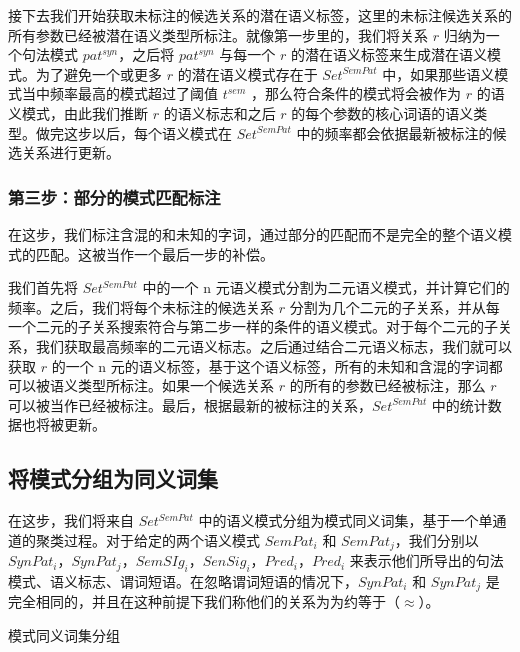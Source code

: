 接下去我们开始获取未标注的候选关系的潜在语义标签，这里的未标注候选关系的所有参数已经被潜在语义类型所标注。就像第一步里的，我们将关系 $r$ 归纳为一个句法模式 $pat^{syn}$，之后将 $pat^{syn}$ 与每一个 $r$ 的潜在语义标签来生成潜在语义模式。为了避免一个或更多 $r$ 的潜在语义模式存在于 $Set^{SemPat}$ 中，如果那些语义模式当中频率最高的模式超过了阈值 $t^{sem}$ ，那么符合条件的模式将会被作为 $r$ 的语义模式，由此我们推断 $r$ 的语义标志和之后 $r$ 的每个参数的核心词语的语义类型。做完这步以后，每个语义模式在 $Set^{SemPat}$ 中的频率都会依据最新被标注的候选关系进行更新。

\subsubsection{第三步：部分的模式匹配标注}
在这步，我们标注含混的和未知的字词，通过部分的匹配而不是完全的整个语义模式的匹配。这被当作一个最后一步的补偿。

我们首先将 $Set^{SemPat}$ 中的一个 n 元语义模式分割为二元语义模式，并计算它们的频率。之后，我们将每个未标注的候选关系 $r$ 分割为几个二元的子关系，并从每一个二元的子关系搜索符合与第二步一样的条件的语义模式。对于每个二元的子关系，我们获取最高频率的二元语义标志。之后通过结合二元语义标志，我们就可以获取 $r$ 的一个 n 元的语义标签，基于这个语义标签，所有的未知和含混的字词都可以被语义类型所标注。如果一个候选关系 $r$ 的所有的参数已经被标注，那么 $r$ 可以被当作已经被标注。最后，根据最新的被标注的关系，$Set^{SemPat}$ 中的统计数据也将被更新。

\subsection{将模式分组为同义词集}
在这步，我们将来自 $Set^{SemPat}$ 中的语义模式分组为模式同义词集，基于一个单通道的聚类过程\citep{papka1998}。对于给定的两个语义模式 $SemPat_i$ 和 $SemPat_j$，我们分别以 $SynPat_i$，$SynPat_j$，$SemSIg_i$，$SenSig_i$，$Pred_i$，$Pred_i$ 来表示他们所导出的句法模式、语义标志、谓词短语。在忽略谓词短语的情况下，$SynPat_i$  和 $SynPat_j$ 是完全相同的，并且在这种前提下我们称他们的关系为为约等于（$ \approx$）。

\begin{algorithm}[htbp]
\SetAlgoLined
{}
\caption[模式同义词集分组]{模式同义词集分组}
\label{algo:grouping}
\end{algorithm}

